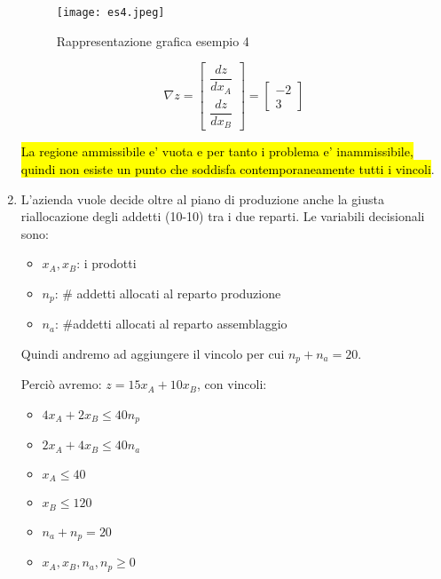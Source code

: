\begin{enumerate}
		\begin{figure}[H]
		\centering
		\texttt{[image: es4.jpeg]}
		\caption{Rappresentazione grafica esempio 4} 
		\label{rge4}
		\end{figure}

		
		$$\nabla z = \left[\begin{array}{c}
			\dfrac{dz}{dx_A}\\
			\dfrac{dz}{dx_B}
		\end{array}\right] = \left[\begin{array}{c}
			-2\\
			3
		\end{array}\right]
		$$
		
		\hl{La regione ammissibile e' vuota e per tanto i problema e' inammissibile, quindi non esiste un punto che soddisfa contemporaneamente tutti i vincoli}.
		
	\item L'azienda vuole decide oltre al piano di produzione anche la giusta riallocazione degli addetti (10-10) tra i due reparti.		
		Le variabili decisionali sono:
		\begin{itemize}
			\item $x_A, x_B$: i prodotti
			\item $n_p$: \# addetti allocati al reparto produzione
			\item $n_a$: \#addetti allocati al reparto assemblaggio
		\end{itemize}
		
		Quindi andremo ad aggiungere il vincolo per cui $n_p + n_a = 20$.
		
		Perciò avremo: $z = 15x_A + 10x_B$, con vincoli:
		\begin{itemize}
			\item $4x_A + 2x_B \leq 40n_p$
			\item $2x_A + 4x_B \leq 40n_a$
			\item $x_A \leq 40$
			\item $x_B \leq 120$
			\item $n_a + n_p = 20$
			\item $x_A, x_B, n_a, n_p \geq 0$
		\end{itemize}
		

\end{enumerate}








